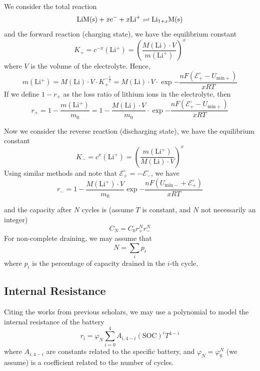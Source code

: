 \documentclass[12pt]{article}
\begin{document}
We consider the total reaction
\begin{equation}
	\rm LiM(s)+ \mathit xe^- + \mathit xLi^+ \rightleftharpoons Li_{1+\mathit x}M(s)
\end{equation}
and the forward reaction (charging state), we have the equilibrium constant
\begin{equation}
	K_+=c^{-x}(\mathrm{Li^+})=\left(\frac{M(\mathrm {Li})\cdot V}{m(\mathrm{Li^+})}\right)^x
\end{equation}
where $V$ is the volume of the electrolyte. Hence, 
\begin{equation}
	m(\mathrm{Li^+})=M(\mathrm {Li})\cdot V\cdot K_+^{-\frac{1}{x}}=M(\mathrm {Li})\cdot V\cdot \exp{-\frac{nF(\mathcal E^{\circ}_+-U_\mathrm{min+})}{xRT}}
\end{equation}
If we define $1-r_+$ as the loss ratio of lithium ions in the electrolyte, then
\begin{equation}
	r_+=1-\frac{m(\mathrm{Li^+})}{m_0}=1-\frac{M(\mathrm {Li})\cdot V}{m_0}\cdot \exp{-\frac{nF(\mathcal E^{\circ}_+-U_\mathrm{min+})}{xRT}}
\end{equation}

Now we consider the reverse reaction (discharging state), we have the equilibrium constant
\begin{equation}
	K_-=c^x(\mathrm{Li^+})=\left(\frac{m(\mathrm{Li^+})}{M(\mathrm {Li})\cdot V}\right)^x
\end{equation}
Using similar methods and note that $\mathcal E^{\circ}_+=-\mathcal E^{\circ}_-$, we have
\begin{equation}
	r_-=1-\frac{M\mathrm{(Li^+)}\cdot V}{m_0}\exp {-\frac{nF(U_\mathrm{min-}+\mathcal E^{\circ}_+)}{xRT}}
\end{equation}

and the capacity after $N$ cycles is (assume $T$ is constant, and $N$ not necessarily an integer)
\begin{equation}
	C_N=C_0r_+^Nr_-^N
\end{equation}
For non-complete draining, we may assume that
\begin{equation}
	N=\sum_i p_i
\end{equation}
where $p_i$ is the percentage of capacity drained in the $i$-th cycle.

\subsection{Internal Resistance}

Citing the works from previous scholars, we may use a polynomial to model the internal resistance of the battery
\begin{equation}
	r_\mathrm i=\varphi_N\sum_{i=0}^4A_{i,4-i}(\mathrm{SOC})^iT^{4-i}
\end{equation}
where $A_{i,4-i}$ are constants related to the specific battery, and $\varphi_N=\varphi_0^N$ (we assume) is a coefficient related to the number of cycles.
\end{document}

